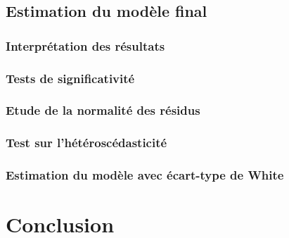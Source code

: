 \documentclass[]{article}
\begin{document}
\subsection{Estimation du modèle final}
\subsubsection{Interprétation des résultats}
\subsubsection{Tests de significativité}
\subsubsection{Etude de la normalité des résidus}
\subsubsection{Test sur l'hétéroscédasticité}
\subsubsection{Estimation du modèle avec écart-type de White}
\section{Conclusion}
\end{document}
